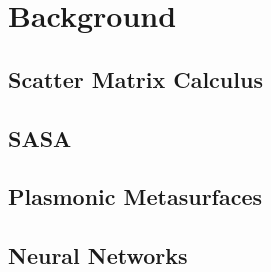 \section{Background} \label{sec:background}

\subsection{Scatter Matrix Calculus} \label{sec:s_mats}

\clearpage

\subsection{SASA}\label{sec:SASA}

\clearpage

\subsection{Plasmonic Metasurfaces}\label{sec:plasmonic}

\clearpage

\subsection{Neural Networks} \label{sec:NN_bg}

